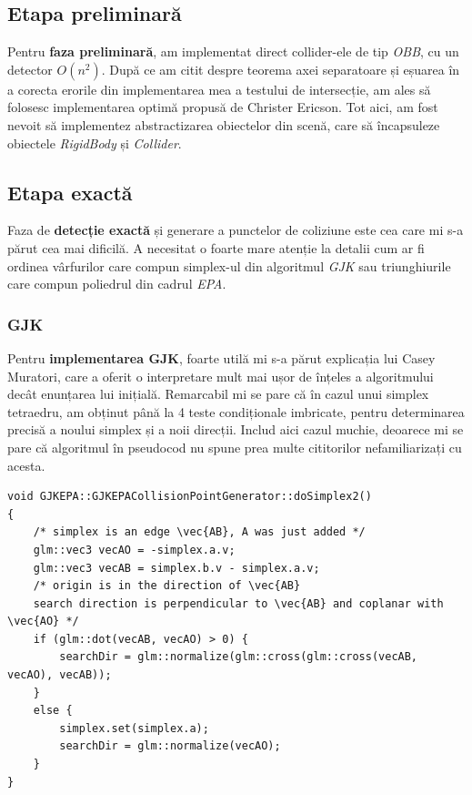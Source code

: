 \documentclass[12pt,a4paper]{report}
\begin{document}
\subsection {Etapa preliminară}

Pentru \textbf{faza preliminară}, am implementat direct collider-ele de tip \textit{OBB}, cu un detector $O(n^2)$. După ce am citit despre teorema axei separatoare și eșuarea în a corecta erorile din implementarea mea a testului de intersecție, am ales să folosesc implementarea optimă propusă de Christer Ericson\cite{ericson_obb}. Tot aici, am fost nevoit să implementez abstractizarea obiectelor din scenă, care să încapsuleze obiectele \textit{RigidBody} și \textit{Collider}.

\subsection {Etapa exactă}

Faza de \textbf{detecție exactă} și generare a punctelor de coliziune este cea care mi s-a părut cea mai dificilă. A necesitat o foarte mare atenție la detalii cum ar fi ordinea vârfurilor care compun simplex-ul din algoritmul \textit{GJK} sau triunghiurile care compun poliedrul din cadrul \textit{EPA}.

\subsubsection{GJK}

Pentru \textbf{implementarea GJK}, foarte utilă mi s-a părut explicația lui Casey Muratori\cite{gjk_muratori}, care a oferit o interpretare mult mai ușor de înțeles a algoritmului decât enunțarea lui inițială\cite{gjk_original}. Remarcabil mi se pare că în cazul unui simplex tetraedru, am obținut până la 4 teste condiționale imbricate, pentru determinarea precisă a noului simplex și a noii direcții. Includ aici cazul muchie, deoarece mi se pare că algoritmul în pseudocod nu spune prea multe cititorilor nefamiliarizați cu acesta.

\begin{lstlisting}[style=myC++, label={code:gjk_simplex2}, caption = {cazul muchie în algoritmul GJK}]
void GJKEPA::GJKEPACollisionPointGenerator::doSimplex2()
{
	/* simplex is an edge \vec{AB}, A was just added */
	glm::vec3 vecAO = -simplex.a.v;
	glm::vec3 vecAB = simplex.b.v - simplex.a.v;
	/* origin is in the direction of \vec{AB}
	search direction is perpendicular to \vec{AB} and coplanar with \vec{AO} */
	if (glm::dot(vecAB, vecAO) > 0) {
		searchDir = glm::normalize(glm::cross(glm::cross(vecAB, vecAO), vecAB));
	}
	else {
		simplex.set(simplex.a);
		searchDir = glm::normalize(vecAO);
	}
}
\end{lstlisting}
\end{document}
